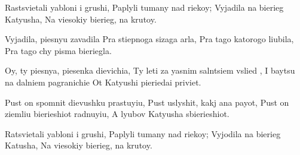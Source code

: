 
\beginverse
Rastsvietali yabloni i grushi,
Paplyli tumany nad riekoy;
Vyjadila na bierieg Katyusha,
Na viesokiy bierieg, na krutoy.
\endverse

\beginverse
Vyjadila, piesnyu zavadila
Pra stiepnoga sizaga arla,
Pra tago katorogo liubila,
Pra tago chy pisma bieriegla.
\endverse

\beginverse
Oy, ty piesnya, piesenka dievichia,
Ty leti za yasnim salntsiem vslied ,
I baytsu na dalniem pagranichie
Ot Katyushi pieriedai priviet.
\endverse

\beginverse
Pust on spomnit dievushku prastuyiu,
Pust uslyshit, kakj ana payot,
Pust on ziemliu bierieshiot radnuyiu,
A lyubov Katyusha sbierieshiot.
\endverse

\beginverse
Ratsvietali yabloni i grushi,
Paplyli tumany nad riekoy;
Vyjodila na bierieg Katusha,
Na viesokiy bierieg, na krutoy.
\endverse

\endsong
